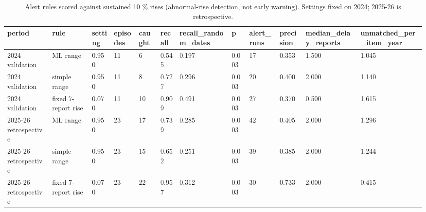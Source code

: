 \begin{table}
\caption{Alert rules scored against sustained 10 \% rises (abnormal-rise detection, not early warning). Settings fixed on 2024; 2025-26 is retrospective.}
\label{tab:r5}
\begin{tabular}{llllllllllll}
\toprule
period & rule & setting & episodes & caught & recall & recall\_random\_dates & p & alert\_runs & precision & median\_delay\_reports & unmatched\_per\_item\_year \\
\midrule
2024 validation & ML range & 0.950 & 11 & 6 & 0.545 & 0.197 & 0.003 & 17 & 0.353 & 1.500 & 1.045 \\
2024 validation & simple range & 0.950 & 11 & 8 & 0.727 & 0.296 & 0.003 & 20 & 0.400 & 2.000 & 1.140 \\
2024 validation & fixed 7-report rise & 0.070 & 11 & 10 & 0.909 & 0.491 & 0.003 & 27 & 0.370 & 0.500 & 1.615 \\
2025-26 retrospective & ML range & 0.950 & 23 & 17 & 0.739 & 0.285 & 0.003 & 42 & 0.405 & 2.000 & 1.296 \\
2025-26 retrospective & simple range & 0.950 & 23 & 15 & 0.652 & 0.251 & 0.003 & 39 & 0.385 & 2.000 & 1.244 \\
2025-26 retrospective & fixed 7-report rise & 0.070 & 23 & 22 & 0.957 & 0.312 & 0.003 & 30 & 0.733 & 2.000 & 0.415 \\
\bottomrule
\end{tabular}
\end{table}
